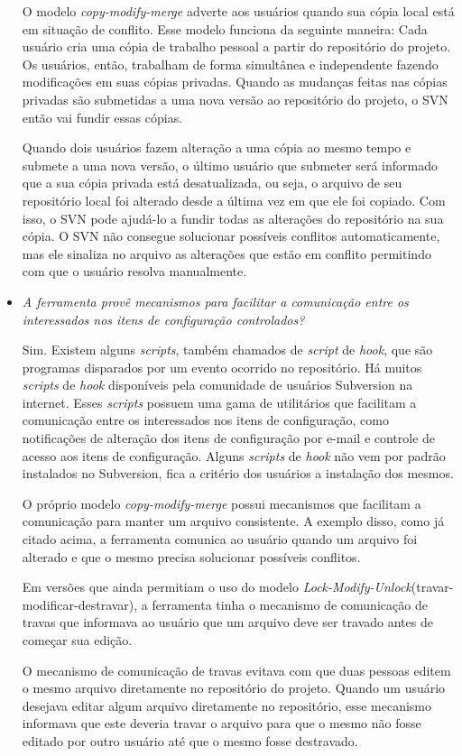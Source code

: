 \begin{itemize}
  O modelo \textit{copy-modify-merge} adverte aos usuários quando sua cópia local está em situação de conflito.
  Esse modelo funciona da seguinte maneira: 
  Cada usuário cria uma cópia de trabalho pessoal a partir do repositório do projeto. Os usuários, então, 
  trabalham de forma simultânea e independente fazendo modificações em suas cópias privadas. Quando as mudanças 
  feitas nas cópias privadas são submetidas a uma nova versão ao repositório do projeto, o SVN então vai fundir essas cópias.
  
  Quando dois usuários fazem alteração a uma cópia ao mesmo tempo e submete a uma nova versão, o último usuário que submeter será informado
  que a sua cópia privada está desatualizada, ou seja, o arquivo de seu repositório local foi alterado desde a 
  última vez em que ele foi copiado. Com isso, o SVN pode ajudá-lo a fundir todas as alterações do repositório na sua cópia. 
  O SVN não consegue solucionar possíveis conflitos automaticamente, mas ele sinaliza no arquivo as alterações que estão em conflito
   permitindo com que o usuário resolva manualmente.
   
     \item \textit{A ferramenta provê mecanismos para facilitar a comunicação entre os interessados nos itens de
  configuração controlados?}
  
  Sim. Existem alguns \textit{scripts}, também chamados de \textit{script} de \textit{hook}, que são programas disparados por um evento ocorrido no repositório\cite{svn-book}.
  Há muitos \textit{scripts} de \textit{hook} disponíveis pela comunidade de usuários Subversion na internet. Esses \textit{scripts} possuem uma gama de utilitários que facilitam 
  a comunicação entre os interessados nos itens de configuração, como notificações de alteração dos itens de configuração por e-mail 
  e controle de acesso aos itens de configuração. Alguns \textit{scripts} de \textit{hook} não vem por padrão instalados no Subversion, fica a critério dos usuários a instalação dos mesmos.
  
  O próprio modelo \textit{copy-modify-merge} possui mecanismos que facilitam a comunicação para manter um arquivo consistente.
  A exemplo disso, como já citado acima, a ferramenta comunica ao usuário quando um arquivo foi alterado e que o mesmo precisa solucionar
  possíveis conflitos.
  
  Em versões que ainda permitiam o uso do modelo \textit{Lock-Modify-Unlock}(travar-modificar-destravar), a ferramenta tinha o mecanismo de comunicação de travas que informava ao usuário que um arquivo deve ser travado antes 
  de começar sua edição. 
  
  O mecanismo de comunicação de travas evitava com que duas pessoas editem o mesmo arquivo diretamente no repositório do projeto. Quando
  um usuário desejava editar algum arquivo diretamente no repositório, esse mecanismo informava que este deveria travar o arquivo para que o mesmo 
  não fosse editado por outro usuário até que o mesmo fosse destravado.
\end{itemize}
